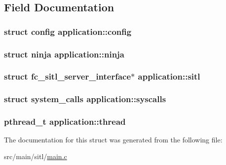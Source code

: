 \subsection{Field Documentation}
\hypertarget{structapplication_a1993bc26ad93ec593f701680a41001cf}{
\subsubsection[{config}]{\setlength{\rightskip}{0pt plus 5cm}struct {\bf config} application\+::config}}\label{structapplication_a1993bc26ad93ec593f701680a41001cf}
\hypertarget{structapplication_a729df3310ba2feba49de72a3d005e860}{
\subsubsection[{ninja}]{\setlength{\rightskip}{0pt plus 5cm}struct {\bf ninja} application\+::ninja}}\label{structapplication_a729df3310ba2feba49de72a3d005e860}
\hypertarget{structapplication_ad8b0003626c6b8e8bae39970f990172d}{
\subsubsection[{sitl}]{\setlength{\rightskip}{0pt plus 5cm}struct fc\+\_\+sitl\+\_\+server\+\_\+interface$\ast$ application\+::sitl}}\label{structapplication_ad8b0003626c6b8e8bae39970f990172d}
\hypertarget{structapplication_a9f2d1076ba777fa64a770d72d5c0b80b}{
\subsubsection[{syscalls}]{\setlength{\rightskip}{0pt plus 5cm}struct {\bf system\+\_\+calls} application\+::syscalls}}\label{structapplication_a9f2d1076ba777fa64a770d72d5c0b80b}
\hypertarget{structapplication_acc8e09a998f76d4deb214f38a3fc2ce6}{
\subsubsection[{thread}]{\setlength{\rightskip}{0pt plus 5cm}pthread\+\_\+t application\+::thread}}\label{structapplication_acc8e09a998f76d4deb214f38a3fc2ce6}


The documentation for this struct was generated from the following file\+:\begin{DoxyCompactItemize}
\item 
src/main/sitl/\hyperlink{sitl_2main_8c}{main.\+c}\end{DoxyCompactItemize}

